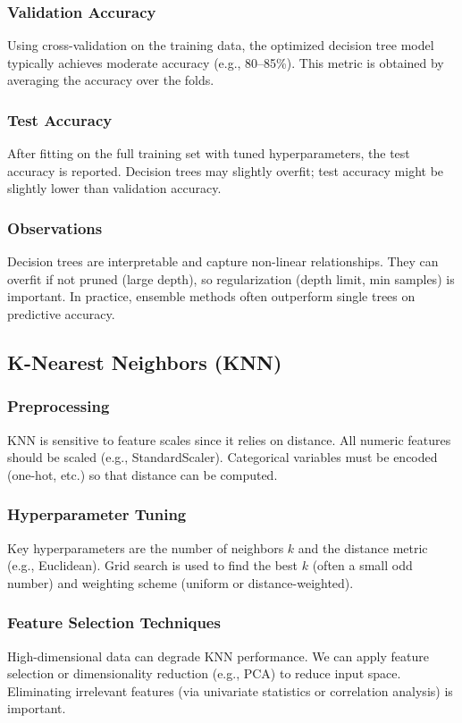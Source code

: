 \documentclass[12pt]{article}
\begin{document}
\subsubsection{Validation Accuracy}
Using cross-validation on the training data, the optimized decision tree model typically achieves moderate accuracy (e.g., 80--85\%). This metric is obtained by averaging the accuracy over the folds.
\subsubsection{Test Accuracy}
After fitting on the full training set with tuned hyperparameters, the test accuracy is reported. Decision trees may slightly overfit; test accuracy might be slightly lower than validation accuracy.
\subsubsection{Observations}
Decision trees are interpretable and capture non-linear relationships. They can overfit if not pruned (large depth), so regularization (depth limit, min samples) is important. In practice, ensemble methods often outperform single trees on predictive accuracy.

\subsection{K-Nearest Neighbors (KNN)}
\subsubsection{Preprocessing}
KNN is sensitive to feature scales since it relies on distance. All numeric features should be scaled (e.g., StandardScaler). Categorical variables must be encoded (one-hot, etc.) so that distance can be computed.
\subsubsection{Hyperparameter Tuning}
Key hyperparameters are the number of neighbors $k$ and the distance metric (e.g., Euclidean). Grid search is used to find the best $k$ (often a small odd number) and weighting scheme (uniform or distance-weighted).
\subsubsection{Feature Selection Techniques}
High-dimensional data can degrade KNN performance. We can apply feature selection or dimensionality reduction (e.g., PCA) to reduce input space. Eliminating irrelevant features (via univariate statistics or correlation analysis) is important.
\end{document}
